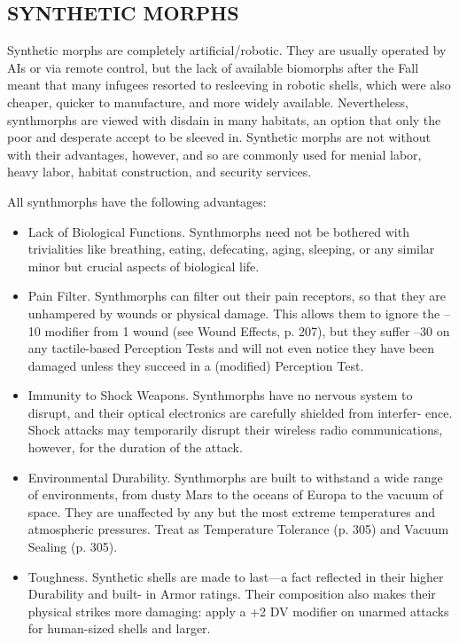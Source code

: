 \subsection{SYNTHETIC MORPHS}

Synthetic morphs are completely artificial/robotic.
They are usually operated by AIs or via remote control, but the lack of available biomorphs after the
Fall meant that many infugees resorted to resleeving
in robotic shells, which were also cheaper, quicker to
manufacture, and more widely available. Nevertheless, synthmorphs are viewed with disdain in many
habitats, an option that only the poor and desperate
accept to be sleeved in. Synthetic morphs are not
without with their advantages, however, and so are
commonly used for menial labor, heavy labor, habitat
construction, and security services.

All synthmorphs have the following advantages:

\begin{itemize}
\item Lack of Biological Functions. Synthmorphs need
 not be bothered with trivialities like breathing,
 eating, defecating, aging, sleeping, or any similar
 minor but crucial aspects of biological life.
\item Pain Filter. Synthmorphs can filter out their
 pain receptors, so that they are unhampered by
 wounds or physical damage. This allows them
 to ignore the –10 modifier from 1 wound (see
 Wound Effects, p. 207), but they suffer –30 on
 any tactile-based Perception Tests and will not
 even notice they have been damaged unless they
 succeed in a (modified) Perception Test.
\item Immunity to Shock Weapons. Synthmorphs have
 no nervous system to disrupt, and their optical
 electronics are carefully shielded from interfer-
 ence. Shock attacks may temporarily disrupt their
 wireless radio communications, however, for the
 duration of the attack.

\item Environmental Durability. Synthmorphs are
 built to withstand a wide range of environments,
 from dusty Mars to the oceans of Europa to the
 vacuum of space. They are unaffected by any but
 the most extreme temperatures and atmospheric
 pressures. Treat as Temperature Tolerance (p.
 305) and Vacuum Sealing (p. 305).

\item Toughness. Synthetic shells are made to last—a
 fact reflected in their higher Durability and built-
  in Armor ratings. Their composition also makes
  their physical strikes more damaging: apply a +2
  DV modifier on unarmed attacks for human-sized
  shells and larger.
\end{itemize}

